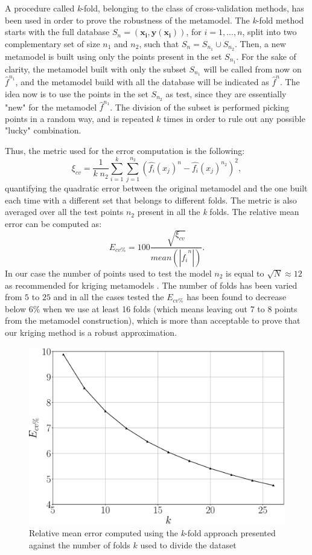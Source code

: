 A procedure called \textit{k}-fold, belonging to the class of cross-validation methods, has been used in order to prove the robustness of the metamodel.
The \textit{k}-fold method starts with the full database $S_n = (\mathbf{x_i}, \mathbf{y}(\mathbf{x_i}))$,  for $i=1,...,n$, split into two complementary set of size $n_1$ and $n_2$, such that $S_n = S_{n_1} \cup S_{n_2}$.
Then, a new metamodel is built using only the points present in the set $S_{n_1}$. 
For the sake of clarity, the metamodel built with only the subset $S_{n_1}$ will be called from now on $\hat{f}^{n_1}$, and the metamodel build with all the database will be indicated as $\hat{f}^{n}$.
The idea now is to use the points in the set $S_{n_2}$ as test, since they are essentially "new" for the metamodel $\hat{f}^{n_1}$.
The division of the subset is performed picking points in a random way, and is repeated $k$ times in order to rule out any possible "lucky" combination.

Thus, the metric used for the error computation is the following:
$$
\xi_{cv} = \dfrac{1}{k \; n_2}\sum_{i = 1}^{k} \sum_{j = 1}^{n_2} (\hat{f_{i}}(x_j)^{n} -\hat{f_{i}}(x_j)^{n_2} )^2 ,
$$
quantifying the quadratic error between the original metamodel and the one built each time with a different set that belongs to different folds.
The metric is also averaged over all the test points $n_2$ present in all the \textit{k} folds. 
The relative mean error can be computed as:
$$
E_{cv\%} = 100 \dfrac{\sqrt{\xi_{cv}}}{mean(|\hat{f_{i}}^{n}|)} .
$$
In our case the number of points used to test the model $n_2$ is equal to $\sqrt{N} \approx 12$ as recommended for kriging metamodels \citet{wang2007review}.
The number of folds has been varied from $5$ to $25$ and in all the cases tested the $E_{cv\%}$ has been found to decrease below $6\%$ when we use at least 16 folds (which means leaving out 7 to 8 points from the metamodel construction), which is more than acceptable to prove that our kriging method is a robust approximation.

\begin{figure}[h]
	\centering
	\includegraphics[width=0.7\linewidth]{chapter_4/figure/kfold_err}
	\caption{Relative mean error computed using the \textit{k}-fold approach presented against the number of folds $k$ used to divide the
		dataset}
	\label{fig:kfold_err}
\end{figure}


